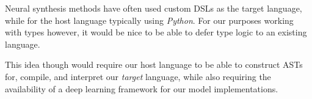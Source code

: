 \documentclass{article}
\begin{document}
Neural synthesis methods have often used custom DSLs as the target language,
while for the host language typically using \emph{Python}.
For our purposes working with types however,
it would be nice to be able to defer type logic to an existing language.%

This idea though would require our host language
to be able to construct ASTs for, compile,
and interpret our \emph{target} language,
while also requiring the availability of a
deep learning framework for our model implementations.

\end{document}

